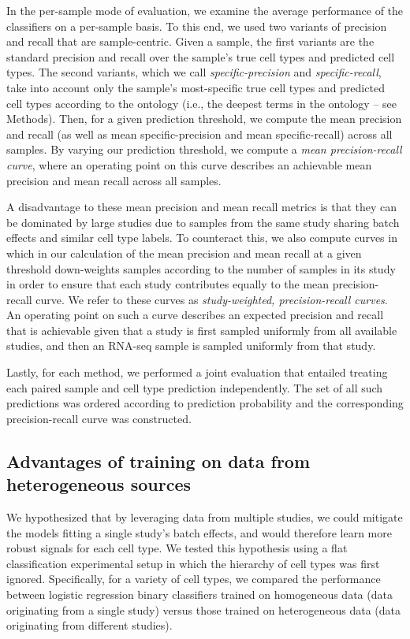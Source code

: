 In the per-sample mode of evaluation, we examine the average performance of the classifiers on a per-sample basis.  To this end, we used two variants of precision and recall that are sample-centric. Given a sample, the first variants are the standard precision and recall over the sample's true cell types and predicted cell types. The second variants, which we call \textit{specific-precision} and \textit{specific-recall}, take into account only the sample's most-specific true cell types and predicted cell types according to the ontology (i.e., the deepest terms in the ontology -- see Methods).  Then, for a given prediction threshold, we compute the mean precision and recall (as well as mean specific-precision and mean specific-recall) across all samples. By varying our prediction threshold, we compute a \textit{mean precision-recall curve}, where an operating point on this curve describes an achievable mean precision and mean recall across all samples. 

A disadvantage to these mean precision and mean recall metrics is that they can be dominated by large studies due to samples from the same study sharing batch effects and similar cell type labels. To counteract this, we also compute curves in which in our calculation of the mean precision and mean recall at a given threshold down-weights samples according to the number of samples in its study in order to ensure that each study contributes equally to the mean precision-recall curve. We refer to these curves as \textit{study-weighted, precision-recall curves}. An operating point on such a curve describes an expected precision and recall that is achievable given that a study is first sampled uniformly from all available studies, and then an RNA-seq sample is sampled uniformly from that study. 

Lastly, for each method, we performed a joint evaluation that entailed treating each paired sample and cell type prediction independently. The set of all such predictions was ordered according to prediction probability and the corresponding precision-recall curve was constructed.

\subsection*{Advantages of training on data from heterogeneous sources}

We hypothesized that by leveraging data from multiple studies, we could mitigate the models fitting a single study's batch effects, and would therefore learn more robust signals for each cell type.  We tested this hypothesis using a flat classification experimental setup in which the hierarchy of cell types was first ignored.  Specifically, for a variety of cell types, we compared the performance between logistic regression binary classifiers trained on homogeneous data (data originating from a single study) versus those trained on heterogeneous data (data originating from different studies). 

